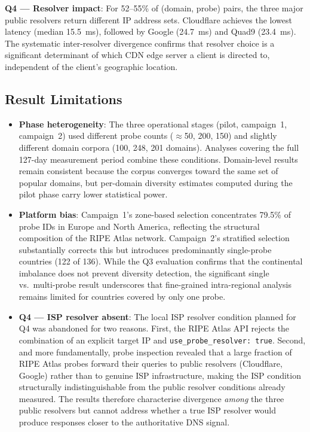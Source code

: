 \textbf{Q4 --- Resolver impact}: For 52--55\% of (domain, probe) pairs, the three major public resolvers return different \ac{IP} address sets. Cloudflare achieves the lowest latency (median 15.5~ms), followed by Google (24.7~ms) and Quad9 (23.4~ms). The systematic inter-resolver divergence confirms that resolver choice is a significant determinant of which \ac{CDN} edge server a client is directed to, independent of the client's geographic location.

\subsection{Result Limitations}
\label{subsec:4.6.2}

\begin{itemize}
  \item \textbf{Phase heterogeneity}: The three operational stages (pilot, campaign~1, campaign~2) used different probe counts ($\approx$50, 200, 150) and slightly different domain corpora (100, 248, 201 domains). Analyses covering the full 127-day measurement period combine these conditions. Domain-level results remain consistent because the corpus converges toward the same set of popular domains, but per-domain diversity estimates computed during the pilot phase carry lower statistical power.

  \item \textbf{Platform bias}: Campaign~1's zone-based selection concentrates 79.5\% of probe IDs in Europe and North America, reflecting the structural composition of the RIPE Atlas network. Campaign~2's stratified selection substantially corrects this but introduces predominantly single-probe countries (122 of 136). While the Q3 evaluation confirms that the continental imbalance does not prevent diversity detection, the significant single vs.\ multi-probe result underscores that fine-grained intra-regional analysis remains limited for countries covered by only one probe.

  \item \textbf{Q4 --- \ac{ISP} resolver absent}: The local \ac{ISP} resolver condition planned for Q4 was abandoned for two reasons. First, the RIPE Atlas \ac{API} rejects the combination of an explicit target \ac{IP} and \texttt{use\_probe\_resolver: true}. Second, and more fundamentally, probe inspection revealed that a large fraction of RIPE Atlas probes forward their queries to public resolvers (Cloudflare, Google) rather than to genuine \ac{ISP} infrastructure, making the \ac{ISP} condition structurally indistinguishable from the public resolver conditions already measured. The results therefore characterise divergence \emph{among} the three public resolvers but cannot address whether a true \ac{ISP} resolver would produce responses closer to the authoritative \ac{DNS} signal.


\end{itemize}

